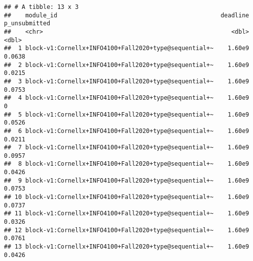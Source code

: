 \documentclass[
]{article}
\newenvironment{Shaded}{\begin{snugshade}}{\end{snugshade}}
\newcommand{\CommentTok}[1]{\textcolor[rgb]{0.56,0.35,0.01}{\textit{#1}}}
\newcommand{\DataTypeTok}[1]{\textcolor[rgb]{0.13,0.29,0.53}{#1}}
\newcommand{\DecValTok}[1]{\textcolor[rgb]{0.00,0.00,0.81}{#1}}
\newcommand{\FloatTok}[1]{\textcolor[rgb]{0.00,0.00,0.81}{#1}}
\newcommand{\KeywordTok}[1]{\textcolor[rgb]{0.13,0.29,0.53}{\textbf{#1}}}
\newcommand{\NormalTok}[1]{#1}
\newcommand{\OperatorTok}[1]{\textcolor[rgb]{0.81,0.36,0.00}{\textbf{#1}}}
\newcommand{\StringTok}[1]{\textcolor[rgb]{0.31,0.60,0.02}{#1}}
\begin{document}
\begin{verbatim}
## # A tibble: 13 x 3
##    module_id                                              deadline p_unsubmitted
##    <chr>                                                     <dbl>         <dbl>
##  1 block-v1:Cornellx+INFO4100+Fall2020+type@sequential+~    1.60e9        0.0638
##  2 block-v1:Cornellx+INFO4100+Fall2020+type@sequential+~    1.60e9        0.0215
##  3 block-v1:Cornellx+INFO4100+Fall2020+type@sequential+~    1.60e9        0.0753
##  4 block-v1:Cornellx+INFO4100+Fall2020+type@sequential+~    1.60e9        0     
##  5 block-v1:Cornellx+INFO4100+Fall2020+type@sequential+~    1.60e9        0.0526
##  6 block-v1:Cornellx+INFO4100+Fall2020+type@sequential+~    1.60e9        0.0211
##  7 block-v1:Cornellx+INFO4100+Fall2020+type@sequential+~    1.60e9        0.0957
##  8 block-v1:Cornellx+INFO4100+Fall2020+type@sequential+~    1.60e9        0.0426
##  9 block-v1:Cornellx+INFO4100+Fall2020+type@sequential+~    1.60e9        0.0753
## 10 block-v1:Cornellx+INFO4100+Fall2020+type@sequential+~    1.60e9        0.0737
## 11 block-v1:Cornellx+INFO4100+Fall2020+type@sequential+~    1.60e9        0.0326
## 12 block-v1:Cornellx+INFO4100+Fall2020+type@sequential+~    1.60e9        0.0761
## 13 block-v1:Cornellx+INFO4100+Fall2020+type@sequential+~    1.60e9        0.0426
\end{verbatim}

\begin{Shaded}
\end{Shaded}
\end{document}
